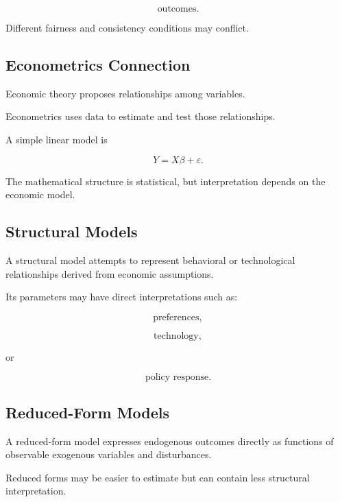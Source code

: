 \[
\boxed{
\text{outcomes}.
}
\]

Different fairness and consistency conditions may conflict.

\subsection{Econometrics Connection}
\label{subsec:econometrics-connection}

Economic theory proposes relationships among variables.

Econometrics uses data to estimate and test those relationships.

A simple linear model is

\[
\boxed{
Y
=
X\beta+\varepsilon.
}
\]

The mathematical structure is statistical, but interpretation depends on the
economic model.

\subsection{Structural Models}
\label{subsec:structural-economic-models}

A structural model attempts to represent behavioral or technological
relationships derived from economic assumptions.

Its parameters may have direct interpretations such as:

\[
\boxed{
\text{preferences},
}
\]

\[
\boxed{
\text{technology},
}
\]

or

\[
\boxed{
\text{policy response}.
}
\]

\subsection{Reduced-Form Models}
\label{subsec:reduced-form-economic-models}

A reduced-form model expresses endogenous outcomes directly as functions of
observable exogenous variables and disturbances.

Reduced forms may be easier to estimate but can contain less structural
interpretation.

